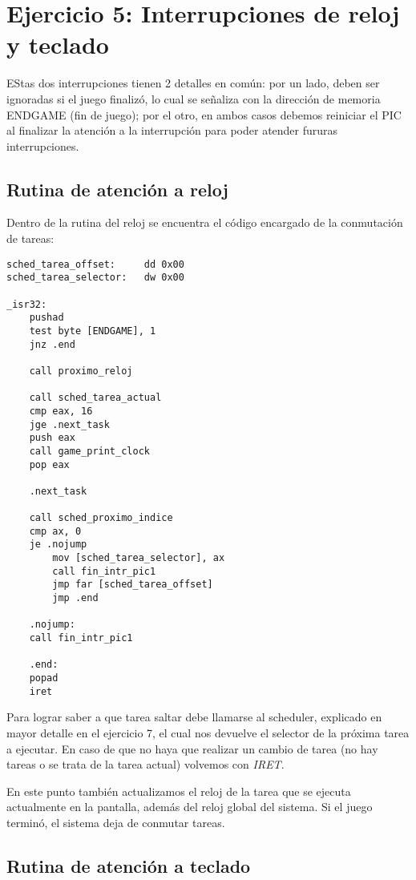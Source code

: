 \section{Ejercicio 5: Interrupciones de reloj y teclado}

    EStas dos interrupciones tienen 2 detalles en común: por un lado, deben ser ignoradas si el juego finalizó, lo cual se señaliza con la dirección de memoria ENDGAME (fin de juego); por el otro, en ambos casos debemos reiniciar el PIC al finalizar la atención a la interrupción para poder atender fururas interrupciones.

	\subsection{Rutina de atención a reloj}

	Dentro de la rutina del reloj se encuentra el código encargado de la conmutación de tareas:

    \lstset{escapechar=@,style=asm}
	\begin{lstlisting}
sched_tarea_offset:     dd 0x00
sched_tarea_selector:   dw 0x00

_isr32:
    pushad
    test byte [ENDGAME], 1
    jnz .end

    call proximo_reloj

    call sched_tarea_actual
    cmp eax, 16 
    jge .next_task
    push eax
    call game_print_clock
    pop eax

    .next_task

    call sched_proximo_indice
    cmp ax, 0
    je .nojump
        mov [sched_tarea_selector], ax
        call fin_intr_pic1
        jmp far [sched_tarea_offset]
        jmp .end

    .nojump:
    call fin_intr_pic1

    .end:
    popad
    iret
	\end{lstlisting}

	Para lograr saber a que tarea saltar debe llamarse al scheduler, explicado en mayor detalle en el ejercicio 7, el cual nos devuelve el selector de la próxima tarea a ejecutar. En caso de que no haya que realizar un cambio de tarea (no hay tareas o se trata de la tarea actual) volvemos con \textit{IRET}.

	En este punto también actualizamos el reloj de la tarea que se ejecuta actualmente en la pantalla, además del reloj global del sistema. Si el juego terminó, el sistema deja de conmutar tareas.

	\subsection{Rutina de atención a teclado}

